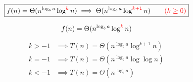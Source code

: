 \begin{frame}{}
  \[
    \boxed{f(n) = \Theta(n^{\log_b a} \log^{\textcolor{red}{k}}n) \implies \Theta(n^{\log_b a} \log^{\textcolor{red}{k+1}}n) \qquad \textcolor{red}{(k \ge 0)}}
  \]

  \pause
  \begin{center}
    \href{https://en.wikipedia.org/wiki/Master\_theorem\_(analysis\_of\_algorithms)}{}
  \end{center}

  \pause
  \[
    f(n) = \Theta(n^{\log_b a} \log^{\textcolor{red}{k}}n)
  \]

  \pause
  \begin{align*}
    k > -1 &\implies T(n) = \Theta(n^{\log_b a} \log^{k+1} n) \\[8pt]
    k = -1 &\implies T(n) = \Theta(n^{\log_b a} \log \log n) \\[8pt]
    k < -1 &\implies T(n) = \Theta(n^{\log_b a})
  \end{align*}
\end{frame}



% 
% 
% 
% 

